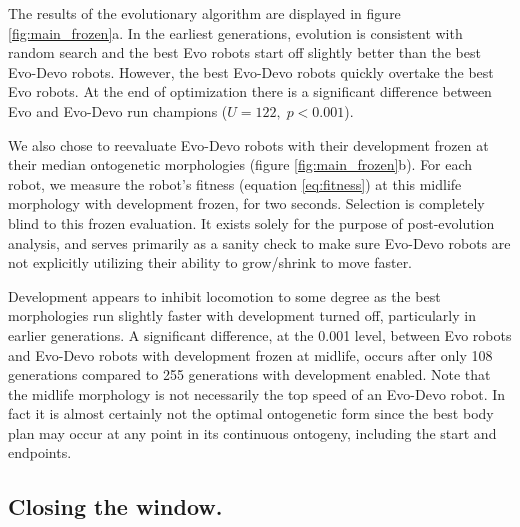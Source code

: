 The results of the evolutionary algorithm are displayed in figure \ref{fig:main_frozen}a. 
In the earliest generations, evolution is consistent with random search and the best Evo robots start off slightly better than the best Evo-Devo robots.
However, the best Evo-Devo robots quickly overtake the best Evo robots. 
At the end of optimization there is a significant difference between Evo and Evo-Devo run champions ($U=122, \; p<0.001$).



We also chose to reevaluate Evo-Devo robots with their development frozen at their median ontogenetic morphologies (figure \ref{fig:main_frozen}b). For each robot, we measure the robot's fitness (equation \ref{eq:fitness}) at this midlife morphology with development frozen, for two seconds. Selection is completely blind to this frozen evaluation. It exists solely for the purpose of post-evolution analysis, and serves primarily as a sanity check to make sure Evo-Devo robots are not explicitly utilizing their ability to grow/shrink to move faster.

Development appears to inhibit locomotion to some degree as the best morphologies run slightly faster with development turned off, particularly in earlier generations.
A significant difference, at the 0.001 level, between Evo robots and Evo-Devo robots with development frozen at midlife, occurs after only 108 generations compared to 255 generations with development enabled.
Note that the midlife morphology is not necessarily the top speed of an Evo-Devo robot. In fact it is almost certainly not the optimal ontogenetic form since the best body plan may occur at any point in its continuous ontogeny, including the start and endpoints.




\subsection{Closing the window.}

